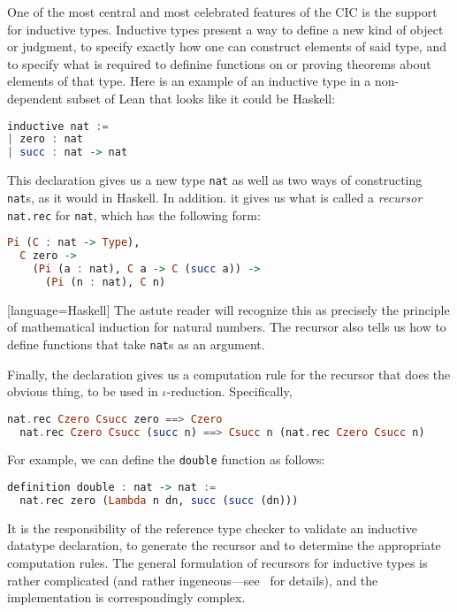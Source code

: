 \documentclass{article}
\begin{document}
\begin{spacing}{1.1}
One of the most central and most celebrated features of the CIC is the support for inductive types. Inductive types present a way to define a new kind of object or judgment, to specify exactly how one can construct elements of said type, and to specify what is required to definine functions on or proving theorems about elements of that type. Here is an example of an inductive type in a non-dependent subset of Lean that looks like it could be Haskell:

\begin{lstlisting}[language=Haskell]
inductive nat :=
| zero : nat
| succ : nat -> nat
\end{lstlisting}

This declaration gives us a new type \lstinline{nat} as well as two ways of constructing \lstinline{nat}s, as it would in Haskell. In addition. it gives us what is called a \emph{recursor} \lstinline{nat.rec} for \lstinline{nat}, which has the following form:
\begin{lstlisting}[language=Haskell]
Pi (C : nat -> Type),
  C zero ->
    (Pi (a : nat), C a -> C (succ a)) ->
      (Pi (n : nat), C n)
\end{lstlisting}[language=Haskell]
The astute reader will recognize this as precisely the principle of mathematical induction for natural numbers. The recursor also tells us how to define functions that take \lstinline{nat}s as an argument.

Finally, the declaration gives us a computation rule for the recursor that does the obvious thing, to be used in \( \iota \)-reduction. Specifically,
\begin{lstlisting}[language=Haskell]
  nat.rec Czero Csucc zero ==> Czero
  nat.rec Czero Csucc (succ n) ==> Csucc n (nat.rec Czero Csucc n)
\end{lstlisting}

For example, we can define the \lstinline{double} function as follows:
\begin{lstlisting}[language=Haskell]
definition double : nat -> nat :=
  nat.rec zero (Lambda n dn, succ (succ (dn)))
\end{lstlisting}

It is the responsibility of the reference type checker to validate an inductive datatype declaration, to generate the recursor and to determine the appropriate computation rules. The general formulation of recursors for inductive types is rather complicated (and rather ingeneous---see~\cite{dybjer1994inductive} for details), and the implementation is correspondingly complex.


\end{spacing}
\end{document}
